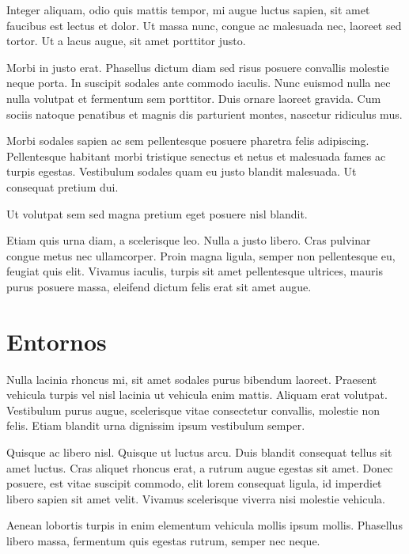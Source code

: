 \documentclass[12pt,a4paper]{report}
\begin{document}
Integer aliquam, odio quis mattis tempor, mi augue luctus sapien, sit amet faucibus est lectus et dolor. Ut massa nunc, congue ac malesuada nec, laoreet sed tortor. Ut a lacus augue, sit amet porttitor justo. 

Morbi in justo erat. Phasellus dictum diam sed risus posuere convallis molestie neque porta. In suscipit sodales ante commodo iaculis. Nunc euismod nulla nec nulla volutpat et fermentum sem porttitor. Duis ornare laoreet gravida. Cum sociis natoque penatibus et magnis dis parturient montes, nascetur ridiculus mus. 

Morbi sodales sapien ac sem pellentesque posuere pharetra felis adipiscing. Pellentesque habitant morbi tristique senectus et netus et malesuada fames ac turpis egestas. Vestibulum sodales quam eu justo blandit malesuada. Ut consequat pretium dui. 

Ut volutpat sem sed magna pretium eget posuere nisl blandit.

Etiam quis urna diam, a scelerisque leo. Nulla a justo libero. Cras pulvinar congue metus nec ullamcorper. Proin magna ligula, semper non pellentesque eu, feugiat quis elit. Vivamus iaculis, turpis sit amet pellentesque ultrices, mauris purus posuere massa, eleifend dictum felis erat sit amet augue. 






\section{Entornos}
\label{seccion.entornos}




Nulla lacinia rhoncus mi, sit amet sodales purus bibendum laoreet. Praesent vehicula turpis vel nisl lacinia ut vehicula enim mattis. Aliquam erat volutpat. Vestibulum purus augue, scelerisque vitae consectetur convallis, molestie non felis. Etiam blandit urna dignissim ipsum vestibulum semper.

Quisque ac libero nisl. Quisque ut luctus arcu. Duis blandit consequat tellus sit amet luctus. Cras aliquet rhoncus erat, a rutrum augue egestas sit amet. Donec posuere, est vitae suscipit commodo, elit lorem consequat ligula, id imperdiet libero sapien sit amet velit. Vivamus scelerisque viverra nisi molestie vehicula. 

Aenean lobortis turpis in enim elementum vehicula mollis ipsum mollis. Phasellus libero massa, fermentum quis egestas rutrum, semper nec neque.
\end{document}
